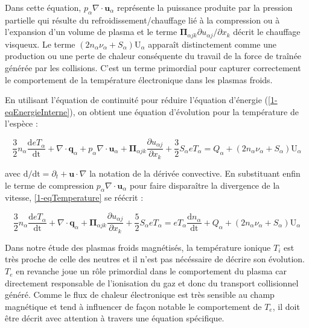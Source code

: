 \begin{refsection}
Dans cette équation, $p_\alpha\nabla\cdot\mathbf u_\alpha$ représente la
puissance produite par la pression partielle qui résulte du
refroidissement/chauffage lié à la compression ou à l'expansion d'un volume de
plasma et le terme $\boldsymbol{\Pi}_{\alpha j k}\partial u_{\alpha
j}/\partial{x_k}$ décrit le chauffage visqueux. Le terme
$(2n_\alpha\nu_\alpha+S_\alpha)\text{U}_\alpha$ apparaît distinctement comme une
production ou une perte de chaleur conséquente du travail de la force de traînée générée par
les collisions. C'est un terme primordial pour capturer correctement le
comportement de la température électronique dans les plasmas froids. 

En utilisant l'équation de
continuité pour réduire l'équation d'énergie (\eqref{1-eqEnergieInterne}), on
obtient une équation d'évolution pour la température de l'espèce :

\begin{equation}
\label{1-eqTemperature}
\frac{3}{2}n_\alpha\frac{\text{d}eT_\alpha}{\text{dt}}+\nabla\cdot\mathbf
q_\alpha + p_\alpha\nabla\cdot\mathbf u_\alpha +\boldsymbol{\Pi}_{\alpha j
k}\frac{\partial u_{\alpha j}}{\partial{x_k}}+ \frac{3}{2}S_\alpha eT_\alpha =
{Q_\alpha}+(2n_\alpha\nu_\alpha+S_\alpha)\text{U}_\alpha
\end{equation}

avec $\text{d}/\text{dt}=\partial_t+\mathbf u\cdot\nabla$ la notation de
la dérivée convective. En substituant enfin le terme de compression
$p_\alpha\nabla\cdot\mathbf u_\alpha$ pour faire disparaître la divergence de la vitesse,
\eqref{1-eqTemperature} se réécrit :

\begin{equation}
\label{1-eqTemperature2}
\frac{3}{2}n_\alpha\frac{\text{d}eT_\alpha}{\text{dt}}+\nabla\cdot\mathbf
q_\alpha +\boldsymbol{\Pi}_{\alpha j k}\frac{\partial u_{\alpha
j}}{\partial{x_k}}+ \frac{5}{2}S_\alpha eT_\alpha = eT_\alpha\frac{\text{d}n_\alpha}{\text{dt}}+ 
{Q_\alpha}+(2n_\alpha\nu_\alpha+S_\alpha)\text{U}_\alpha
\end{equation}

Dans notre étude des plasmas froids magnétisés, la température ionique $T_i$
est très proche de celle des neutres et il n'est pas nécéssaire de décrire
son évolution. $T_e$ en revanche joue un rôle primordial dans le comportement
du plasma car directement responsable de l'ionisation du gaz et donc du
transport collisionnel généré. Comme le flux de chaleur électronique est très
sensible au champ magnétique et tend à influencer de façon notable le
comportement de $T_e$, il doit être décrit avec attention à travers une équation
spécifique.


\end{refsection}
